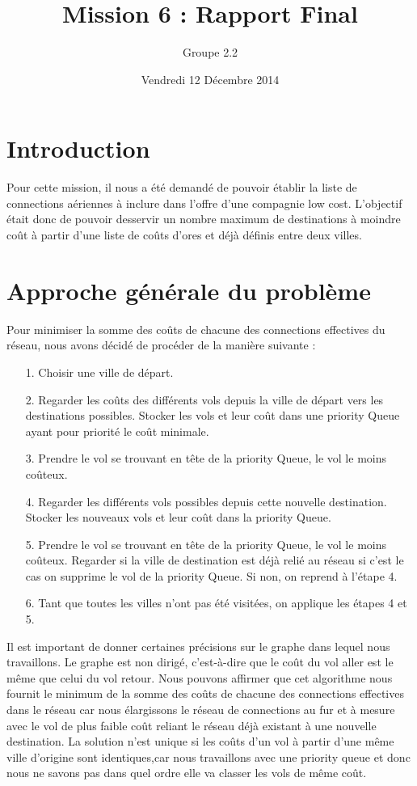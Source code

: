 \documentclass[10pt,a4paper]{article}
\date{Vendredi 12 Décembre 2014}
\author{Groupe 2.2}
\title{Mission 6 : Rapport Final}
\begin{document}
\maketitle
\section*{Introduction}
Pour cette mission, il nous a été demandé de pouvoir établir la liste de connections aériennes à inclure dans l'offre d'une compagnie low cost. L'objectif était donc de pouvoir desservir un nombre maximum de destinations à moindre coût à partir d'une liste de coûts d'ores et déjà définis entre deux villes.

\section*{Approche générale du problème}
Pour minimiser la somme des coûts de chacune des connections effectives du réseau, nous avons décidé de procéder de la manière suivante :
\begin{itemize}
\item[1.] Choisir une ville de départ.
\item[2.] Regarder les coûts des différents vols depuis la ville de départ vers les destinations possibles. Stocker les vols et leur coût dans une priority Queue ayant pour priorité le coût minimale. 
\item[3.] Prendre le vol se trouvant en tête de la priority Queue, le vol le moins coûteux.   
\item[4.] Regarder les différents vols possibles depuis cette nouvelle destination. Stocker les nouveaux vols et leur coût dans la priority Queue.
\item[5.] Prendre le vol se trouvant en tête de la priority Queue, le vol le moins coûteux. Regarder si la ville de destination est déjà relié au réseau si c'est le cas on supprime le vol de la priority Queue. Si non, on reprend à l'étape 4.
\item[6.] Tant que toutes les villes n'ont pas été visitées, on applique les étapes 4 et 5.
\end{itemize}
Il est important de donner certaines précisions sur le graphe dans lequel nous travaillons. Le graphe est non dirigé, c'est-à-dire que le coût du vol aller est le même que celui du vol retour.
Nous pouvons affirmer que cet algorithme nous fournit le minimum de la somme des coûts de chacune des connections effectives dans le réseau car nous élargissons le réseau de connections au fur et à mesure avec le vol de plus faible coût reliant le réseau déjà existant à une nouvelle destination. 
La solution n'est unique si les coûts d'un vol à partir d'une même ville d'origine sont identiques,car nous travaillons avec une priority queue et donc nous ne savons pas dans quel ordre elle va classer les vols de même coût. 
\end{document}
